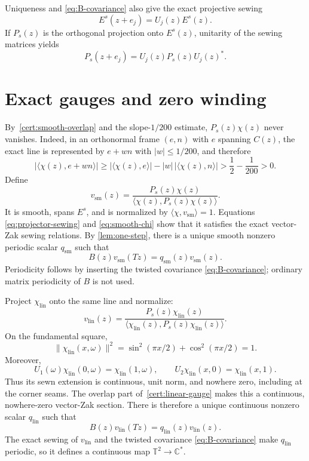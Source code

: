 \documentclass[11pt,reqno]{amsart}
\numberwithin{equation}{section}
\theoremstyle{definition}
\newcommand{\C}{\mathbb C}
\newcommand{\T}{\mathbb T}
\newcommand{\ip}[2]{\langle #1,#2\rangle}
\newcommand{\norm}[1]{\lVert #1\rVert}
\begin{document}
Uniqueness and \eqref{eq:B-covariance} also give the exact projective sewing
\[
 E^s(z+e_j)=U_j(z)E^s(z).
\]
If $P_s(z)$ is the orthogonal projection onto $E^s(z)$, unitarity of the
sewing matrices yields
\begin{equation}\label{eq:projector-sewing}
 P_s(z+e_j)=U_j(z)P_s(z)U_j(z)^*.
\end{equation}

\section{Exact gauges and zero winding}
\label{sec:winding}

By~\ref{cert:smooth-overlap} and the slope-$1/200$ estimate,
$P_s(z)\chi(z)$ never vanishes.  Indeed, in an orthonormal frame $(e,n)$
with $e$ spanning $C(z)$, the exact line is represented by $e+wn$ with
$|w|\le1/200$, and therefore
\[
 |\ip{\chi(z)}{e+wn}|\ge
 |\ip{\chi(z)}e|-|w|\,|\ip{\chi(z)}n|
 >\frac12-\frac1{200}>0.
\]
Define
\begin{equation}\label{eq:v-smooth}
 v_{\mathrm{sm}}(z)=
 \frac{P_s(z)\chi(z)}
 {\ip{\chi(z)}{P_s(z)\chi(z)}}.
\end{equation}
It is smooth, spans $E^s$, and is normalized by
$\ip{\chi}{v_{\mathrm{sm}}}=1$.  Equations
\eqref{eq:projector-sewing} and \eqref{eq:smooth-chi} show that it satisfies
the exact vector-Zak sewing relations.  By \cref{lem:one-step}, there is a
unique smooth nonzero periodic scalar $q_{\mathrm{sm}}$ such that
\begin{equation}\label{eq:qsm-definition}
 B(z)v_{\mathrm{sm}}(Tz)=q_{\mathrm{sm}}(z)v_{\mathrm{sm}}(z).
\end{equation}
Periodicity follows by inserting the twisted covariance
\eqref{eq:B-covariance}; ordinary matrix periodicity of $B$ is not used.

Project $\chi_{\mathrm{lin}}$ onto the same line and normalize:
\begin{equation}\label{eq:v-linear}
 v_{\mathrm{lin}}(z)=
 \frac{P_s(z)\chi_{\mathrm{lin}}(z)}
 {\ip{\chi_{\mathrm{lin}}(z)}{P_s(z)\chi_{\mathrm{lin}}(z)}}.
\end{equation}
On the fundamental square,
\[
 \norm{\chi_{\mathrm{lin}}(x,\omega)}^2
 =\sin^2(\pi x/2)+\cos^2(\pi x/2)=1.
\]
Moreover,
\[
 U_1(\omega)\chi_{\mathrm{lin}}(0,\omega)
   =\chi_{\mathrm{lin}}(1,\omega),\qquad
 U_2\chi_{\mathrm{lin}}(x,0)
   =\chi_{\mathrm{lin}}(x,1).
\]
Thus its sewn extension is continuous, unit norm, and nowhere zero, including
at the corner seams.
The overlap part of~\ref{cert:linear-gauge} makes this a continuous,
nowhere-zero vector-Zak section.  There is therefore a unique continuous
nonzero scalar $q_{\mathrm{lin}}$ such that
\begin{equation}\label{eq:qlin-definition}
 B(z)v_{\mathrm{lin}}(Tz)=q_{\mathrm{lin}}(z)v_{\mathrm{lin}}(z).
\end{equation}
The exact sewing of $v_{\mathrm{lin}}$ and the twisted covariance
\eqref{eq:B-covariance} make $q_{\mathrm{lin}}$ periodic, so it defines a
continuous map $\T^2\to\C^*$.
\end{document}
